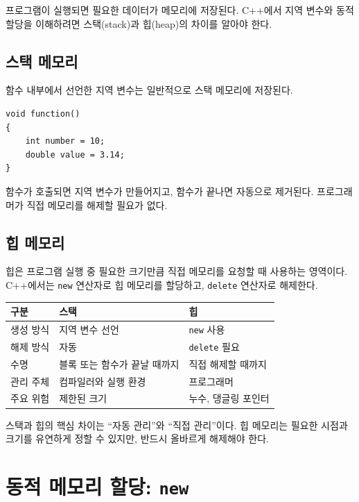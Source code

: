 \documentclass[11pt,a4paper]{article}
\begin{document}
프로그램이 실행되면 필요한 데이터가 메모리에 저장된다.
C++에서 지역 변수와 동적 할당을 이해하려면 스택(stack)과 힙(heap)의 차이를 알아야 한다.

\subsection{스택 메모리}

함수 내부에서 선언한 지역 변수는 일반적으로 스택 메모리에 저장된다.

\begin{lstlisting}
void function()
{
    int number = 10;
    double value = 3.14;
}
\end{lstlisting}

함수가 호출되면 지역 변수가 만들어지고, 함수가 끝나면 자동으로 제거된다.
프로그래머가 직접 메모리를 해제할 필요가 없다.

\subsection{힙 메모리}

힙은 프로그램 실행 중 필요한 크기만큼 직접 메모리를 요청할 때 사용하는 영역이다.
C++에서는 \texttt{new} 연산자로 힙 메모리를 할당하고, \texttt{delete} 연산자로 해제한다.

\begin{center}
\begin{tabular}{lll}
\toprule
구분 & 스택 & 힙 \\
\midrule
생성 방식 & 지역 변수 선언 & \texttt{new} 사용 \\
해제 방식 & 자동 & \texttt{delete} 필요 \\
수명 & 블록 또는 함수가 끝날 때까지 & 직접 해제할 때까지 \\
관리 주체 & 컴파일러와 실행 환경 & 프로그래머 \\
주요 위험 & 제한된 크기 & 누수, 댕글링 포인터 \\
\bottomrule
\end{tabular}
\end{center}

\begin{importantbox}
스택과 힙의 핵심 차이는 ``자동 관리''와 ``직접 관리''이다.
힙 메모리는 필요한 시점과 크기를 유연하게 정할 수 있지만, 반드시 올바르게 해제해야 한다.
\end{importantbox}

\section{동적 메모리 할당: \texttt{new}}
\end{document}
